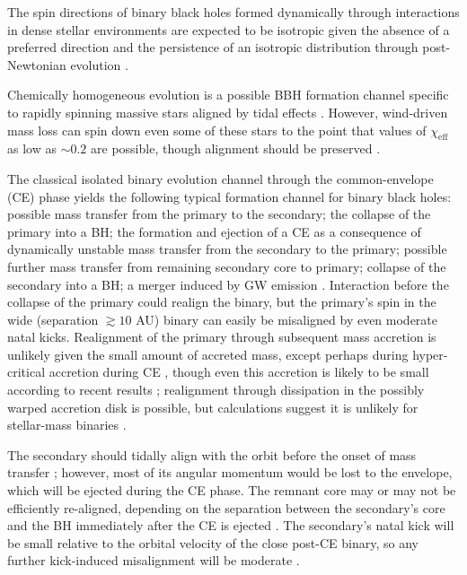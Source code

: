 \documentclass[modern,linenumbers]{aastex61}
\begin{document}
The spin directions of binary black holes formed dynamically through
interactions in dense stellar environments
\citep{SigurdssonHernquist:1993,PZMcMillan:2000,Rodriguez:2015,Stone:2016}
are expected to be isotropic given the absence of a preferred
direction \citep[e.g.,][]{2016ApJ...832L...2R} and the persistence of
an isotropic distribution through post-Newtonian evolution
\citep{2004PhRvD..70l4020S,2007ApJ...661L.147B}.

Chemically homogeneous evolution is a possible BBH formation channel
specific to rapidly spinning massive stars aligned by tidal effects
\citep{MandeldeMink:2016,Marchant:2016}.  However, wind-driven
mass loss can spin down even some of these stars to the point that
values of $\chi_\textrm{eff}$ as low as $\sim 0.2$ are possible,
though alignment should be preserved \citep{Marchant:2016}.

The classical isolated binary evolution channel \citep{TutukovYungelson:1973,TutukovYungelson:1993,Lipunov:1997,Dominik:2015} through the
common-envelope (CE) phase \citep{Ivanova:2013} 
yields the following typical formation channel for
binary black holes: possible mass transfer from the primary to the
secondary; the collapse of the primary into a BH; the formation and
ejection of a CE as a consequence of dynamically unstable mass
transfer from the secondary to the primary; possible further mass
transfer from remaining secondary core to primary; collapse of the
secondary into a BH; a merger induced by GW emission
\citep[e.g.,][]{2016Natur.534..512B,Stevenson:2017}.  Interaction
before the collapse of the primary could realign the binary, but the
primary's spin in the wide (separation $\gtrsim 10$ AU) binary can
easily be misaligned by even moderate \citep{Mandel:2015kicks}
natal kicks.  Realignment of the primary through subsequent mass
accretion is unlikely given the small amount of accreted mass, except
perhaps during hyper-critical accretion during CE \citep{2005ApJ...632.1035O}, though even this accretion is likely to be small according to recent results \citep{MacLeodRamirezRuiz:2015}; realignment through dissipation in the possibly warped
accretion disk \citep{1975ApJ...195L..65B} is possible, but calculations
suggest it is unlikely for stellar-mass binaries \citep{KLOP}.

The secondary should tidally align with the orbit before the onset of
mass transfer
\citep[e.g.,][]{2000ApJ...541..319K,2013PhRvD..87j4028G}; however,
most of its angular momentum would be lost to the envelope, which will
be ejected during the CE phase.  The remnant core may or may not be
efficiently re-aligned, depending on the separation between the
secondary's core and the BH immediately after the CE is ejected
\citep{2016MNRAS.462..844K}.  The secondary's natal kick will be small
relative to the orbital velocity of the close post-CE binary, so any
further kick-induced misalignment will be moderate
\citep{2016ApJ...832L...2R}.
\end{document}
